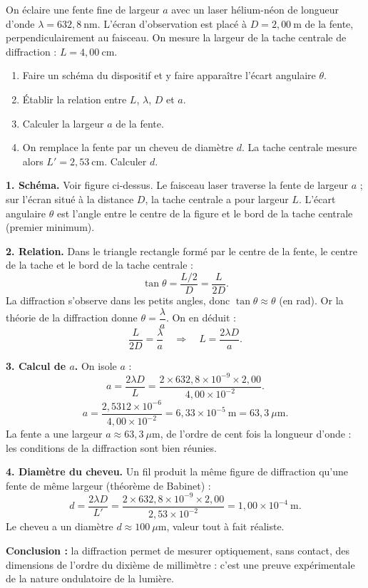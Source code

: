 \documentclass[11pt]{article}
\begin{document}
\begin{exoresolu}
On éclaire une fente fine de largeur $a$ avec un laser hélium-néon de longueur d'onde $\lambda = 632,8\ \text{nm}$. L'écran d'observation est placé à $D = 2,00\ \text{m}$ de la fente, perpendiculairement au faisceau. On mesure la largeur de la tache centrale de diffraction : $L = 4,00\ \text{cm}$.
\begin{enumerate}
\item Faire un schéma du dispositif et y faire apparaître l'écart angulaire $\theta$.
\item Établir la relation entre $L$, $\lambda$, $D$ et $a$.
\item Calculer la largeur $a$ de la fente.
\item On remplace la fente par un cheveu de diamètre $d$. La tache centrale mesure alors $L' = 2,53\ \text{cm}$. Calculer $d$.
\end{enumerate}
\tcblower
\textbf{1. Schéma.} Voir figure ci-dessus. Le faisceau laser traverse la fente de largeur $a$ ; sur l'écran situé à la distance $D$, la tache centrale a pour largeur $L$. L'écart angulaire $\theta$ est l'angle entre le centre de la figure et le bord de la tache centrale (premier minimum).

\textbf{2. Relation.} Dans le triangle rectangle formé par le centre de la fente, le centre de la tache et le bord de la tache centrale :
\[ \tan\theta = \frac{L/2}{D} = \frac{L}{2D}. \]
La diffraction s'observe dans les petits angles, donc $\tan\theta \approx \theta$ (en rad). Or la théorie de la diffraction donne $\theta = \dfrac{\lambda}{a}$. On en déduit :
\[ \frac{L}{2D} = \frac{\lambda}{a} \quad\Longrightarrow\quad \boxed{L = \frac{2\lambda D}{a}}. \]

\textbf{3. Calcul de $a$.} On isole $a$ :
\[ a = \frac{2\lambda D}{L} = \frac{2 \times 632,8\times 10^{-9} \times 2,00}{4,00\times 10^{-2}}. \]
\[ a = \frac{2,5312\times 10^{-6}}{4,00\times 10^{-2}} = 6,33\times 10^{-5}\ \text{m} = 63,3\ \mu\text{m}. \]
La fente a une largeur $a \approx 63,3\ \mu\text{m}$, de l'ordre de cent fois la longueur d'onde : les conditions de la diffraction sont bien réunies.

\textbf{4. Diamètre du cheveu.} Un fil produit la même figure de diffraction qu'une fente de même largeur (théorème de Babinet) :
\[ d = \frac{2\lambda D}{L'} = \frac{2 \times 632,8\times 10^{-9} \times 2,00}{2,53\times 10^{-2}} = 1,00\times 10^{-4}\ \text{m}. \]
Le cheveu a un diamètre $d \approx 100\ \mu\text{m}$, valeur tout à fait réaliste.

\textbf{Conclusion :} la diffraction permet de mesurer optiquement, sans contact, des dimensions de l'ordre du dixième de millimètre : c'est une preuve expérimentale de la nature ondulatoire de la lumière.
\end{exoresolu}
\end{document}
